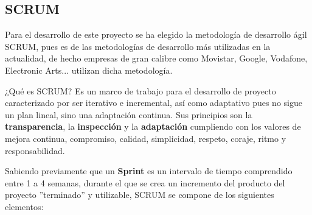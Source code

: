\subsection{SCRUM}
Para el desarrollo de este proyecto se ha elegido la metodología de desarrollo ágil SCRUM, pues es de las metodologías de desarrollo más utilizadas en la actualidad, de hecho empresas de gran calibre como Movistar, Google, Vodafone, Electronic Arts... utilizan dicha metodología. \bigskip

¿Qué es SCRUM? Es un marco de trabajo para el desarrollo de proyecto caracterizado por ser iterativo e incremental, así como adaptativo pues no sigue un plan lineal, sino una adaptación continua. Sus principios son la \textbf{transparencia}, la \textbf{inspección} y la \textbf{adaptación} cumpliendo con los valores de mejora continua, compromiso, calidad, simplicidad, respeto, coraje, ritmo y responsabilidad. \bigskip

Sabiendo previamente que un \textbf{Sprint} es un intervalo de tiempo comprendido entre 1 a 4 semanas, durante el que se crea un incremento del producto del proyecto ''terminado'' y utilizable, SCRUM se compone de los siguientes elementos:

